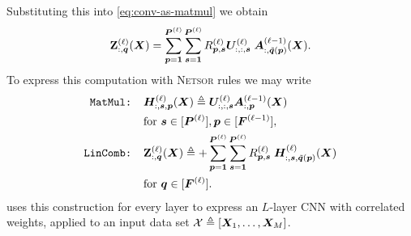 \documentclass[accepted]{uai2021} %
\newcommand{\Netsor}{\textsc{Netsor}\xspace}
\newcommand{\layera}[2]{\mathbf{Z}^{(#1)}_{#2}(\mX)}
\newcommand{\layernla}[2]{\vA^{(#1)}_{#2}(\mX)}
\newcommand{\layerU}[1]{\vU^{(#1)}}
\newcommand{\layersizebase}{\vF}
\newcommand{\layersize}[1]{{\layersizebase^{\bra{#1}}}}
\newcommand{\patchsizebase}{\vP}
\newcommand{\patchsize}[1]{{\patchsizebase^{\bra{#1}}}}
\newcommand{\patchf}[2]{{\tilde#1\bra{#2}}}
\newcommand{\patch}{\vp}               %
\newcommand{\nextpatch}{\vq}
\newcommand{\0}{\boldsymbol{0}}
\newcommand{\1}{\boldsymbol{1}}
\begin{document}
Substituting this into \cref{eq:conv-as-matmul} we obtain
\begin{equation}
\layera{\ell}{:,\nextpatch} = \sum_{\patch=\1}^{\patchsize{\ell}} \sum_{\vs=\1}^{\patchsize{\ell}}R\ssup{\ell}_{\patch,\vs}\layerU{\ell}_{:,:,\vs} \; \layernla{\ell-1}{:,\patchf{\nextpatch}{\patch}}.
\label{eq:correlated-conv-as-matmul}
\end{equation}
To express this computation with \Netsor rules we may write
\begin{align}
  \texttt{MatMul: }& \mH\ssup{\ell}_{:,\vs,\patch}\bra{\mX} \eqdef \layerU{\ell}_{:,:,\vs}\layernla{\ell-1}{:,\patch} \nonumber\\
  &\text{for }\vs\in \countto{\patchsize{\ell}},\patch \in \countto{\layersize{\ell-1}}, \label{eq:cnn-corr-matmul} \\
  \texttt{LinComb: }& \layera{\ell}{:,\nextpatch} \eqdef +
\sum_{\patch=\1}^{\patchsize{\ell}} \sum_{\vs=\1}^{\patchsize{\ell}}
R\ssup{\ell}_{\patch,\vs}\;
\mH\ssup{\ell}_{:,\vs,\patchf{\nextpatch}{\patch}}\bra{\mX}  \nonumber\\
  &\text{for }\nextpatch\in \countto{\layersize{\ell}}.
\label{eq:cnn-corr-lincomb}
\end{align}
 uses this construction for every layer to express an
$L$-layer \ac{CNN} with correlated weights, applied to an input data set
${\mathcal{X}}\triangleq{\left[ {\bm{X}}_{1},\dots,{\bm{X}}_{M} \right]}$.
\end{document}
